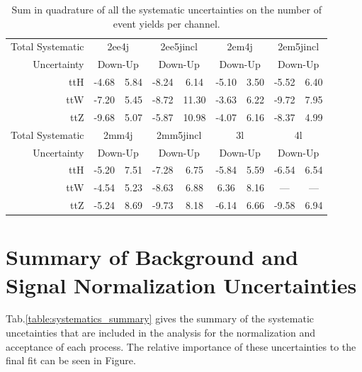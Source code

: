 \begin{table}
\begin{center}
\begin{tabular}{r|cc|cc|cc|cc|}
Total Systematic & \multicolumn{2}{c|}{2ee4j} & \multicolumn{2}{c|}{2ee5jincl} & \multicolumn{2}{c|}{2em4j} & \multicolumn{2}{c|}{2em5jincl} \\ 
Uncertainty & \multicolumn{2}{c|}{Down-Up} & \multicolumn{2}{c|}{Down-Up} & \multicolumn{2}{c|}{Down-Up} & \multicolumn{2}{c|}{Down-Up} \\ 
\hline 
ttH & -4.68 & 5.84 & -8.24 & 6.14 & -5.10 & 3.50 & -5.52 & 6.40   \\ 
ttW & -7.20 & 5.45 & -8.72 & 11.30 & -3.63 & 6.22 & -9.72 & 7.95 \\ 
ttZ & -9.68 & 5.07 & -5.87 & 10.98 & -4.07 & 6.16 & -8.37 & 4.99 \\ 
\hline 
Total Systematic & \multicolumn{2}{c|}{2mm4j}& \multicolumn{2}{c|}{2mm5jincl} & \multicolumn{2}{c|}{3l} & \multicolumn{2}{c|}{4l} \\ 
Uncertainty & \multicolumn{2}{c|}{Down-Up} &\multicolumn{2}{c|}{Down-Up} & \multicolumn{2}{c|}{Down-Up} & \multicolumn{2}{c|}{Down-Up} \\ 
\hline 
ttH &-5.20 & 7.51& -7.28 & 6.75 & -5.84 & 5.59 & -6.54 & 6.54\\ 
ttW &-4.54 & 5.23& -8.63 & 6.88 &  6.36 & 8.16 & --- & --- \\ 
ttZ &-5.24 & 8.69& -9.73 & 8.18 & -6.14 & 6.66 & -9.58 & 6.94\\ 
\end{tabular} 
\caption{Sum in quadrature of all the systematic uncertainties on the number of event yields per channel.}
\label{table:systematics_total_detector} 
\end{center} 
\end{table} 


\section{Summary of Background and Signal Normalization Uncertainties}

Tab.\ref{table:systematics_summary} gives the summary of the systematic uncetainties that are included in the analysis for the normalization and acceptance of each process. The relative importance of these uncertainties to the final fit can be seen in Figure. 


